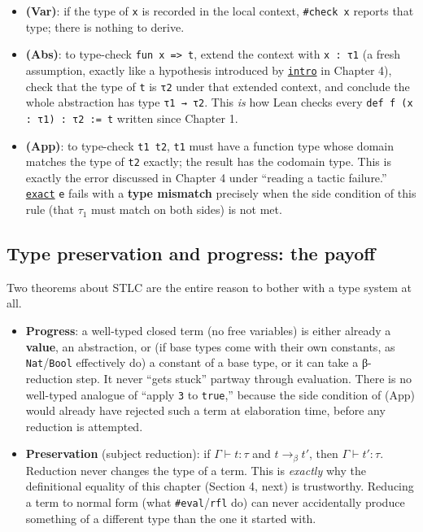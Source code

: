 \begin{itemize}
\tightlist
\item
  \textbf{(Var)}: if the type of \texttt{x} is recorded in the local context, \texttt{\#check x} reports that type; there is nothing to derive.
\item
  \textbf{(Abs)}: to type-check \texttt{fun x => t}, extend the context with \texttt{x : τ1} (a fresh assumption, exactly like a hypothesis introduced by \href{https://lean-lang.org/doc/reference/latest/Tactic-Proofs/Tactic-Reference/}{\texttt{intro}} in Chapter 4), check that the type of \texttt{t} is \texttt{τ2} under that extended context, and conclude the whole abstraction has type \texttt{τ1 → τ2}. This \emph{is} how Lean checks every \texttt{def f (x : τ1) : τ2 := t} written since Chapter 1.
\item
  \textbf{(App)}: to type-check \texttt{t1 t2}, \texttt{t1} must have a function type whose domain matches the type of \texttt{t2} exactly; the result has the codomain type. This is exactly the error discussed in Chapter 4 under ``reading a tactic failure.'' \href{https://lean-lang.org/doc/reference/latest/Tactic-Proofs/Tactic-Reference/}{\texttt{exact}} \texttt{e} fails with a \textbf{type mismatch} precisely when the side condition of this rule (that \(\tau_1\) must match on both sides) is not met.
\end{itemize}

\subsection{Type preservation and progress: the payoff}\label{sec:05-rigor-check:03-typing-rules-and-safety:4}

Two theorems about STLC are the entire reason to bother with a type system at all.

\begin{itemize}
\tightlist
\item
  \textbf{Progress}: a well-typed closed term (no free variables) is either already a \textbf{value}, an abstraction, or (if base types come with their own constants, as \texttt{Nat}/\texttt{Bool} effectively do) a constant of a base type, or it can take a β-reduction step. It never ``gets stuck'' partway through evaluation. There is no well-typed analogue of ``apply \texttt{3} to \texttt{true},'' because the side condition of (App) would already have rejected such a term at elaboration time, before any reduction is attempted.
\item
  \textbf{Preservation} (subject reduction): if \(\Gamma \vdash t : \tau\) and \(t \longrightarrow_\beta t'\), then \(\Gamma \vdash t' : \tau\). Reduction never changes the type of a term. This is \emph{exactly} why the definitional equality of this chapter (Section 4, next) is trustworthy. Reducing a term to normal form (what \texttt{\#eval}/\texttt{rfl} do) can never accidentally produce something of a different type than the one it started with.
\end{itemize}

